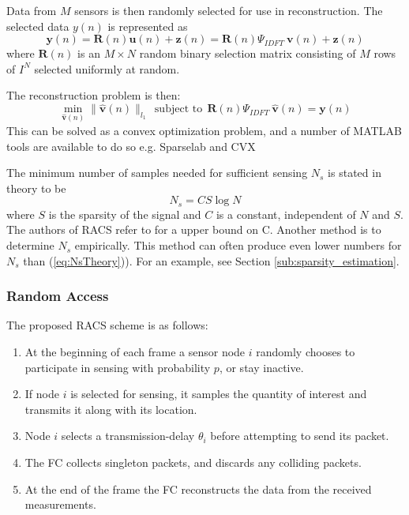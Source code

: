 \documentclass[Main]{subfiles}
\begin{document}
			\newpage
			Data from $M$ sensors is then randomly selected for use in reconstruction.
			The selected data $y(n)$ is represented as
			\begin{equation}
				\mathbf{y}(n) = 
					\mathbf{R}(n) \mathbf{u}(n) + \mathbf{z}(n)
					= \mathbf{R}(n) \Psi_{IDFT}\ \mathbf{v}(n) + \mathbf{z}(n)
			\end{equation}
			where $\mathbf{R}(n)$ is an $M \times N$ random binary selection matrix consisting of $M$ rows of $I^N$ selected uniformly at random.

			The reconstruction problem is then:
			\begin{equation}
				\min_{\mathbf{\hat{v}}(n)} 
					\|\mathbf{\hat{v}}(n)\|_{l_1} 
					\ \ \text{subject to} \ \ 
					\mathbf{R}(n) \Psi_{IDFT}\ \mathbf{\hat{v}}(n) = \mathbf{y}(n)
					\label{eq:minimizationProblem}
			\end{equation}
			This can be solved as a convex optimization problem, and a number of MATLAB tools are available to do so e.g. Sparselab \cite{SparseLab:Online} and CVX \cite{CVX:Online}

			The minimum number of samples needed for sufficient sensing $N_s$ is stated in theory to be
			\begin{equation}
				N_s = CS \log{N}
				\label{eq:NsTheory} 
			\end{equation}
			where $S$ is the sparsity of the signal and $C$ is a constant, independent of $N$ and $S$.
			The authors of RACS refer to \cite{Candes2006} for a upper bound on C.
			Another method is to determine $N_s$ empirically.
			This method can often produce even lower numbers for $N_s$ than (\ref{eq:NsTheory})).
			For an example, see Section \ref{sub:sparsity_estimation}.
		


		\subsubsection{Random Access} %
		\label{sub:random_access}

			The proposed RACS scheme is as follows:

			\begin{enumerate}[label=\bfseries \arabic*:]
				\item 
					At the beginning of each frame a sensor node $i$ randomly chooses to participate in sensing with probability $p$, or stay inactive.
				\item 
					If node $i$ is selected for sensing, it samples the quantity of interest and transmits it along with its location.
				\item
					Node $i$ selects a transmission-delay $\theta_{i}$ before attempting to send its packet.
				\item
					The FC collects singleton packets, and discards any colliding packets.
				\item
					At the end of the frame the FC reconstructs  the data from the received measurements.

			\end{enumerate}
\end{document}
